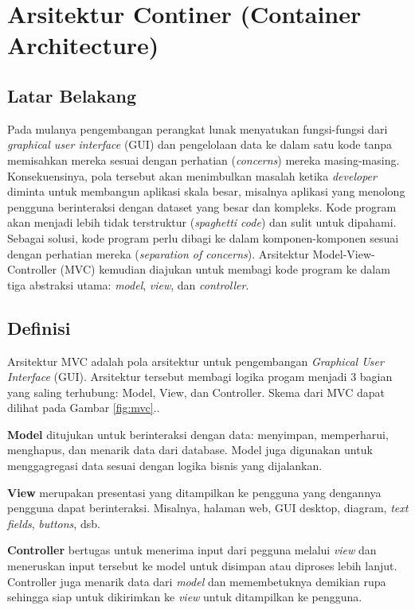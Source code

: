 \chapter{Arsitektur Continer (Container Architecture)}

\section{Latar Belakang}
Pada mulanya pengembangan perangkat lunak menyatukan fungsi-fungsi dari \textit{graphical user interface} (GUI) dan pengelolaan data ke dalam satu kode tanpa memisahkan mereka sesuai dengan perhatian (\textit{concerns}) mereka masing-masing. 
Konsekuensinya, pola tersebut akan menimbulkan masalah ketika \textit{developer} diminta untuk membangun aplikasi  skala besar,  misalnya aplikasi yang menolong pengguna berinteraksi dengan dataset yang besar dan kompleks. Kode program akan menjadi lebih tidak terstruktur (\textit{spaghetti code}) dan sulit untuk dipahami. 
Sebagai solusi, kode program perlu dibagi ke dalam komponen-komponen sesuai dengan perhatian mereka (\textit{separation of concerns}). 
Arsitektur Model-View-Controller (MVC) kemudian diajukan untuk membagi kode program ke dalam tiga abstraksi utama: \textit{model}, \textit{view}, dan \textit{controller}.

\section{Definisi}
Arsitektur MVC adalah pola arsitektur untuk pengembangan \textit{Graphical User Interface} (GUI). Arsitektur tersebut membagi logika progam menjadi 3 bagian yang saling terhubung: Model, View, dan Controller. Skema dari MVC dapat dilihat pada Gambar \ref{fig:mvc}..

\textbf{Model} ditujukan untuk berinteraksi dengan data: menyimpan, memperharui, menghapus, dan menarik data dari database. Model juga digunakan untuk menggagregasi data sesuai dengan logika bisnis yang dijalankan. 

\textbf{View} merupakan presentasi yang ditampilkan ke pengguna yang dengannya pengguna dapat berinteraksi. Misalnya, halaman web, GUI desktop, diagram, \textit{text fields}, \textit{buttons}, dsb.

\textbf{Controller} bertugas untuk menerima input dari pegguna melalui \textit{view} dan meneruskan input tersebut ke model untuk disimpan atau diproses lebih lanjut. Controller juga menarik data dari \textit{model} dan memembetuknya demikian rupa sehingga siap untuk dikirimkan ke \textit{view} untuk ditampilkan ke pengguna.

